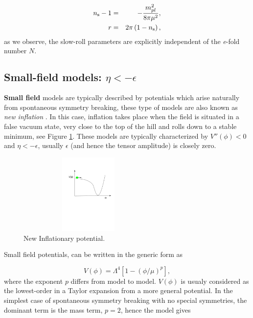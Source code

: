 \documentclass{rmaa}
\begin{document}
\begin{eqnarray}
n_{\rm s}-1&=&-\frac{m^2_{pl}}{8\pi \mu^2}, \nonumber \\
r &=& 2\pi \left(1 - n_{\rm s}\right),
\end{eqnarray}
%
as we observe, the slow-roll parameters are explicitly independent of the \textit{e}-fold number $N$. 

\subsection{Small-field models: $\eta < -\epsilon$}


\textbf{Small field} models are typically described by potentials which arise 
naturally from spontaneous symmetry breaking, these type of models are also
known as \textit{new inflation} \citep{Steinhardt, Linde2}. 
In this case, inflation takes place when the field is situated in a false vacuum state,
very close to the top of the hill and rolls down to a stable minimum, see Figure \ref{fig:new2}. 
These models are typically characterized by $V''\left(\phi\right) < 0$
and $\eta < -\epsilon$, usually $\epsilon$ (and hence the tensor amplitude)
is closely zero. 

 \begin{figure}
 \begin{center}
  \includegraphics[trim = 20mm 120mm 10mm 40mm, clip, width=7cm, height=4cm]{new1.pdf}
	\caption{New Inflationary potential.}
	\label{fig:new2}
 \end{center}	
\end{figure}

\noindent
Small field potentials, can be written in the generic form as

\begin{equation}
V\left(\phi\right) = \Lambda^4 \left[1 - \left(\phi / \mu\right)^p\right],
\end{equation}
%
where the exponent $p$ differs from model to model. $V(\phi)$ is usualy considered as the 
lowest-order in a Taylor expansion from a more general potential.
In the simplest case of spontaneous symmetry breaking with no special symmetries, 
the dominant term is the mass term, $p = 2$, hence the model gives
\end{document}
